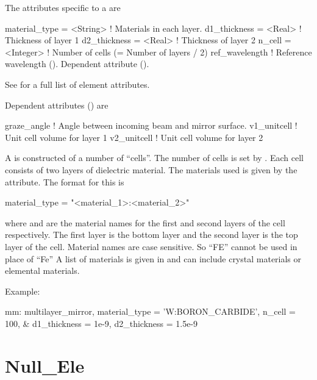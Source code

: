 {
The attributes specific to a  are 
\begin{example}
  material_type    = <String>  ! Materials in each layer.
  d1_thickness     = <Real>    ! Thickness of layer 1
  d2_thickness     = <Real>    ! Thickness of layer 2
  n_cell           = <Integer> ! Number of cells (= Number of layers / 2)
  ref_wavelength               ! Reference wavelength (). Dependent attribute ().
\end{example}
See  for a full list of element attributes.

Dependent attributes () are
\begin{example}
  graze_angle      ! Angle between incoming beam and mirror surface.
  v1_unitcell      ! Unit cell volume for layer 1
  v2_unitcell      ! Unit cell volume for layer 2 
\end{example}

A  is constructed of a number of ``cells''. The
number of cells is set by . Each cell consists of two
layers of dielectric material. The materials used is given by
the  attribute. The format for this is
\begin{example}
  material_type = "<material_1>:<material_2>"
\end{example}
where  and  are the material names
for the first and second layers of the cell respectively. The first
layer is the bottom layer and the second layer is the top layer of the
cell.  Material names are case sensitive. So ``FE'' cannot be used in
place of ``Fe'' A list of materials is given in 
and can include crystal materials or elemental materials.

Example:
\begin{example}
  mm: multilayer_mirror, material_type = 'W:BORON_CARBIDE', n_cell = 100, &
            d1_thickness = 1e-9, d2_thickness = 1.5e-9
\end{example}

\section{Null_Ele}
\label{s:null.ele}

}

